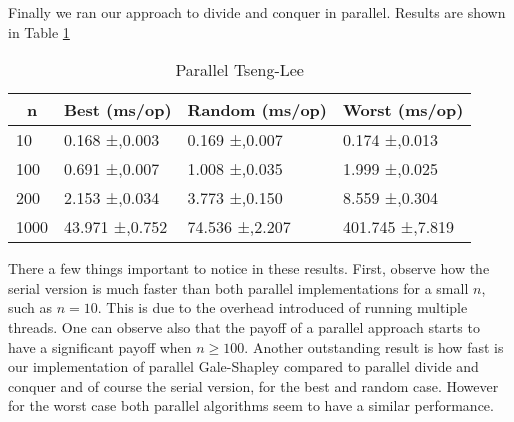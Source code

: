 Finally we ran our approach to divide and conquer in parallel. Results are shown in Table \ref{tab:parallel-tseng-lee}

\begin{table}[h]
    \centering
\begin{tabular}{|l|l|l|l|}
\hline
\multicolumn{1}{|c|}{\textbf{n}} & \multicolumn{1}{c|}{\textbf{Best (ms/op)}} & \multicolumn{1}{c|}{\textbf{Random (ms/op)}} & \multicolumn{1}{c|}{\textbf{Worst (ms/op)}} \\ \hline
10                               & 0.168 ±,0.003                              & 0.169 ±,0.007                                & 0.174 ±,0.013                               \\ \hline
100                              & 0.691 ±,0.007                              & 1.008 ±,0.035                                & 1.999 ±,0.025                               \\ \hline
200                              & 2.153 ±,0.034                              & 3.773 ±,0.150                                & 8.559 ±,0.304                               \\ \hline
1000                             & 43.971 ±,0.752                             & 74.536 ±,2.207                               & 401.745 ±,7.819                             \\ \hline
\end{tabular}
    \caption{Parallel Tseng-Lee}
    \label{tab:parallel-tseng-lee}
\end{table}

There a few things important to notice in these results. First, observe how the serial version is much faster than both parallel implementations for a small $n$, such as $n=10$. This is due to the overhead introduced of running multiple threads. One can observe also that the payoff of a parallel approach starts to have a significant payoff when $n \geq 100$. Another outstanding result is how fast is our implementation of parallel Gale-Shapley compared to parallel divide and conquer and of course the serial version, for the best and random case. However for the worst case both parallel algorithms seem to have a similar performance.